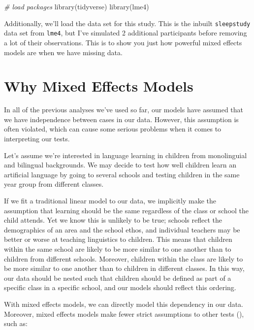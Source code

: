 \documentclass[
]{book}
\newenvironment{Shaded}{\begin{snugshade}}{\end{snugshade}}
\newcommand{\CommentTok}[1]{\textcolor[rgb]{0.56,0.35,0.01}{\textit{#1}}}
\newcommand{\FunctionTok}[1]{\textcolor[rgb]{0.00,0.00,0.00}{#1}}
\newcommand{\NormalTok}[1]{#1}
\begin{document}
\begin{Shaded}
\begin{Highlighting}[]
\CommentTok{\# load packages}
\FunctionTok{library}\NormalTok{(tidyverse)}
\FunctionTok{library}\NormalTok{(lme4)}
\end{Highlighting}
\end{Shaded}

Additionally, we'll load the data set for this study. This is the inbuilt \texttt{sleepstudy} data set from \texttt{lme4}, but I've simulated 2 additional participants before removing a lot of their observations. This is to show you just how powerful mixed effects models are when we have missing data.

\hypertarget{why-mixed-effects-models}{%
\section{Why Mixed Effects Models}\label{why-mixed-effects-models}}

In all of the previous analyses we've used so far, our models have assumed that we have independence between cases in our data. However, this assumption is often violated, which can cause some serious problems when it comes to interpreting our tests.

Let's assume we're interested in language learning in children from monolinguial and bilingual backgrounds. We may decide to test how well children learn an artificial language by going to several schools and testing children in the same year group from different classes.

If we fit a traditional linear model to our data, we implicitly make the assumption that learning should be the same regardless of the class or school the child attends. Yet we know this is unlikely to be true; schools reflect the demographics of an area and the school ethos, and individual teachers may be better or worse at teaching linguistics to children. This means that children within the same school are likely to be more similar to one another than to children from different schools. Moreover, children within the class are likely to be more similar to one another than to children in different classes. In this way, our data should be nested such that children should be defined as part of a specific class in a specific school, and our models should reflect this ordering.

With mixed effects models, we can directly model this dependency in our data. Moreover, mixed effects models make fewer strict assumptions to other tests (\citet{field2012discovering}), such as:
\end{document}
